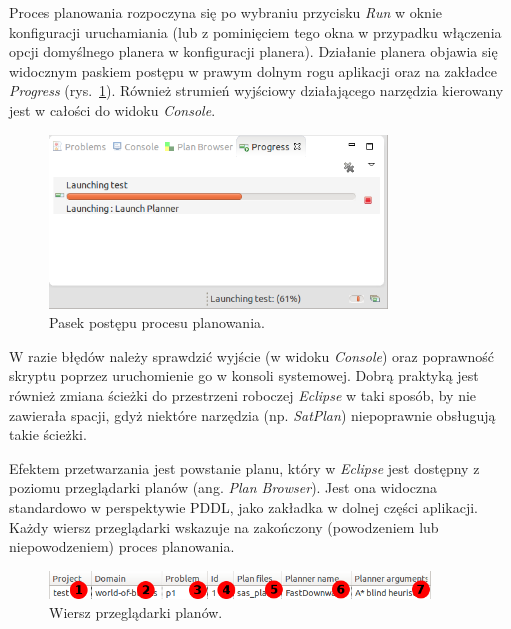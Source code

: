 Proces planowania rozpoczyna się po wybraniu przycisku \emph{Run} w oknie konfiguracji uruchamiania (lub z pominięciem tego okna w przypadku włączenia opcji domyślnego planera w konfiguracji planera). Działanie planera objawia się widocznym paskiem postępu w prawym dolnym rogu aplikacji oraz na zakładce \emph{Progress} (rys.~\ref{fig:run_progress}). Również strumień wyjściowy działającego narzędzia kierowany jest w całości do widoku \emph{Console}.

\begin{figure}[h!]
    \centering
    \includegraphics[width=0.8\textwidth]{img/run_progress}
    \caption{Pasek postępu procesu planowania.}
    \label{fig:run_progress}
\end{figure}

W razie błędów należy sprawdzić wyjście (w widoku \emph{Console}) oraz poprawność skryptu poprzez uruchomienie go w konsoli systemowej. Dobrą praktyką jest również zmiana ścieżki do przestrzeni roboczej \emph{Eclipse} w taki sposób, by nie zawierała spacji, gdyż niektóre narzędzia (np. \emph{SatPlan}) niepoprawnie obsługują takie ścieżki.

Efektem przetwarzania jest powstanie planu, który w \textit{Eclipse} jest dostępny z poziomu przeglądarki planów (ang. \textit{Plan Browser}). Jest ona widoczna standardowo w perspektywie PDDL, jako zakładka w dolnej części aplikacji. Każdy wiersz przeglądarki wskazuje na zakończony (powodzeniem lub niepowodzeniem) proces planowania. 

\begin{figure}[h!]
    \centering
    \includegraphics[width=0.9\textwidth]{img/plan_browser_row}
    \caption{Wiersz przeglądarki planów.}
    \label{fig:plan_browser_row}
\end{figure}


